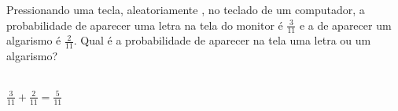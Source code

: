 \begin{ex}
Pressionando uma tecla, aleatoriamente , no teclado de um computador, a probabilidade de aparecer uma letra na tela do monitor é $\frac{3}{11}$  e a de aparecer um algarismo é $\frac{2}{11}$.
Qual é a probabilidade de aparecer na tela uma letra ou um algarismo?
 \begin{sol} 
 \phantom{A} \\
  $\frac{3}{11}+\frac{2}{11}=\frac{5}{11}$
 \end{sol}
\end{ex}